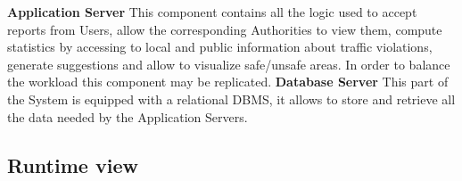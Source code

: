 \textbf{Application Server}\newline
This component contains all the logic used to accept reports from Users, allow the corresponding Authorities to view them, compute statistics by accessing to local and public information about traffic violations, generate suggestions and allow to visualize safe/unsafe areas. In order to balance the workload this component may be replicated.
\newline
\textbf{Database Server}\newline
This part of the System is equipped with a relational DBMS, it allows to store and retrieve all the data needed by the Application Servers.

\subsection{Runtime view}
